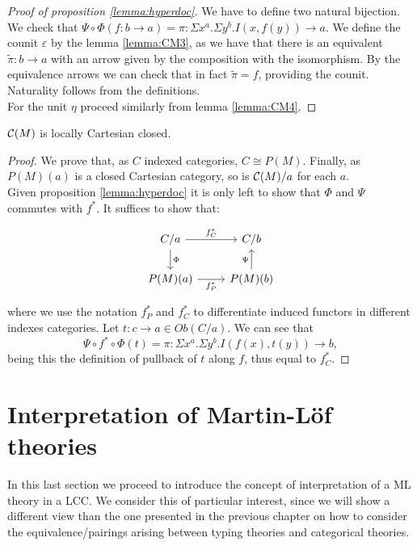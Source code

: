 \begin{proof}[Proof of proposition \ref{lemma:hyperdoc}]
  We have to define two natural bijection. We check that $\Psi\circ\Phi(f:b\to a) = \pi: \Sigma x^a. \Sigma y^b.I(x,f(y)) \to a$. We define the counit $\varepsilon$ by the lemma \ref{lemma:CM3}, as we have that there is an equivalent $\tilde \pi : b \to a$ with an arrow given by the composition with the isomorphism. By the equivalence arrows we can check that in fact $\tilde \pi = f$, providing the counit. Naturality follows from the definitions.\\

For the  unit $\eta$ proceed similarly from lemma \ref{lemma:CM4}.

\end{proof}
\begin{theorem}
  $\mathcal{C}(M)$ is locally Cartesian closed.
\end{theorem}
\begin{proof}
  We prove that, as $C$ indexed categories, $C\cong P(M)$. Finally, as $P(M)(a)$ is a closed Cartesian category, so is $\mathcal{C}(M)/a$ for each $a$.\\

  Given proposition \ref{lemma:hyperdoc} it is only left to show that $\Phi$ and $\Psi$ commutes with $f^*$. It suffices to show that:
  \[
    \begin{tikzpicture}
      \node {\begin{tikzcd}
          C/a \ar[d,"\Phi"]\ar[r,"f_C^*"] & C/b\\
          P(M)(a)\ar[r,swap,"f_P^*"] &   P(M)(b)\ar[u,"\Psi"]
        \end{tikzcd}};
    \end{tikzpicture}
  \]
  where we use the notation $f_P^*$ and $f_C^*$ to differentiate  induced functors in different indexes categories.   Let $t:c\to a \in Ob(C/a)$. We can see that
  $$\Psi\circ f^*\circ \Phi(t) = \pi: \Sigma x^a. \Sigma y^b.I(f(x),t(y)) \to b,$$
  being this the definition of pullback of $t$ along $f$, thus equal to $f_C^*$.
\end{proof}


\section{Interpretation of Martin-L\"of theories}
\label{InterpretationLCC}
In this last section we proceed to introduce the concept of interpretation of a ML theory in a LCC. We consider this of particular interest, since we will show a different view than the one presented in the previous chapter on how to consider the equivalence/pairings arising between typing theories and categorical theories.\\

